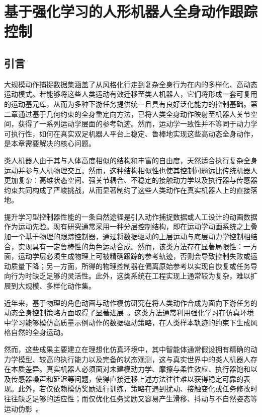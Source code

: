 \chapter{基于强化学习的人形机器人全身动作跟踪控制}
\section{引言}
大规模动作捕捉数据集涵盖了从风格化行走到复杂全身行为在内的多样化、高动态运动模式\cite{mahmood2019amass}。若能够将这些人类运动有效迁移至类人机器人，它们将形成一套可复用的运动基元库，从而为多种下游任务提供统一且具有良好泛化能力的控制基础\cite{starke2019neural}。第二章通过基于几何约束的全身重定向方法，已将人类全身动作映射至机器人关节空间，获得了一系列运动学层面的参考轨迹。然而，运动学一致性并不等同于动力学可执行性，如何在真实双足机器人平台上稳定、鲁棒地实现这些高动态全身动作，是本章需要解决的核心问题。

类人机器人由于其与人体高度相似的结构和丰富的自由度，天然适合执行复杂全身运动并参与人机物理交互。然而，这种结构相似性也使其控制问题远比传统机器人更加复杂：高维状态空间、强关节耦合、不稳定的接触动力学以及执行器与传感器约束共同构成了严峻挑战，从而显著制约了这些人类动作在真实机器人上的直接落地\cite{orin2013centroidal,escande2014hierarchical}。

提升学习型控制器性能的一条自然途径是引入动作捕捉数据或人工设计的动画数据作为运动先验\cite{peng2018deepmimic,starke2019neural}。现有研究通常采用一种分层控制结构，即在运动学动画系统之上叠加一个基于物理的跟踪控制器，通过将数据驱动的上层运动与底层动力学控制相结合，实现具有一定鲁棒性的角色运动合成。然而，该类方法存在显著局限性：一方面，运动学层必须生成物理上可被精确跟踪的参考轨迹，否则会导致控制失败或运动质量下降；另一方面，所得的物理控制器在偏离原始参考以实现自恢复或任务导向行为时缺乏足够的灵活性。此外，这类系统在工程实现上通常较为复杂，难以扩展到大规模、多样化动作集\cite{peng2018deepmimic}。


近年来，基于物理的角色动画与动作模仿研究在将人类动作合成为面向下游任务的动态全身控制策略方面取得了显著进展~\cite{luo2023universal,tessler2024maskedmimic,huang2025diffuse,pan2025tokenhsi}。这类方法通常利用强化学习在仿真环境中学习能够模仿高质量示例动作的数据驱动策略，在人类样本轨迹的约束下生成风格自然的全身运动。

然而，这些成果主要建立在理想化仿真环境中，其中智能体通常假设拥有精确的动力学模型、较高的执行能力以及完备的状态观测，这与真实世界中的类人机器人存在本质差异。真实机器人必须面对未建模动力学、摩擦与柔性效应、执行器饱和以及传感器噪声和延迟等问题，使得直接迁移上述方法往往难以获得稳定可靠的表现。此外，若仅依赖模仿奖励进行训练，策略在遇到扰动、接触变化或任务修改时往往缺乏足够的适应性；而仅优化任务奖励又容易产生滑移、抖动与不自然姿态等运动伪影~\cite{duan2016benchmarking,jiang2025two}。

